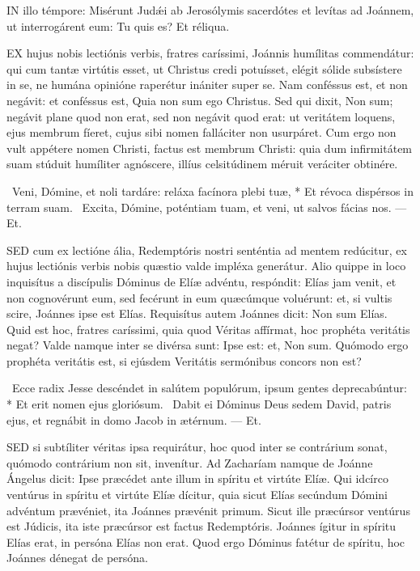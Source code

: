 


\lettrine[lines=2]{I}{N} illo témpore: Misérunt Judǽi ab Jerosólymis sacerdótes et levítas ad Joánnem, ut interrogárent eum: Tu quis es? Et réliqua.



\lettrine[lines=2]{E}{X} hujus nobis lectiónis verbis, fratres caríssimi, Joánnis humílitas commendátur: qui cum tantæ virtútis esset, ut Christus credi potuísset, elégit sólide subsístere in se, ne humána opinióne raperétur inániter super se. Nam conféssus est, et non negávit: et conféssus est, Quia non sum ego Christus. Sed qui dixit, Non sum; negávit plane quod non erat, sed non negávit quod erat: ut veritátem loquens, ejus membrum fíeret, cujus sibi nomen falláciter non usurpáret. Cum ergo non vult appétere nomen Christi, factus est membrum Christi: quia dum infirmitátem suam stúduit humíliter agnóscere, illíus celsitúdinem méruit veráciter obtinére.

\R\ Veni, Dómine, et noli tardáre: reláxa facínora plebi tuæ, * Et révoca dispérsos in terram suam. \V\ Excita, Dómine, poténtiam tuam, et veni, ut salvos fácias nos. --- Et.


\lettrine[lines=2]{S}{ED} cum ex lectióne ália, Redemptóris nostri senténtia ad mentem redúcitur, ex hujus lectiónis verbis nobis quæstio valde impléxa generátur. Alio quippe in loco inquisítus a discípulis Dóminus de Elíæ advéntu, respóndit: Elías jam venit, et non cognovérunt eum, sed fecérunt in eum quæcúmque voluérunt: et, si vultis scire, Joánnes ipse est Elías. Requisítus autem Joánnes dicit: Non sum Elías. Quid est hoc, fratres caríssimi, quia quod Véritas affírmat, hoc prophéta veritátis negat? Valde namque inter se divérsa sunt: Ipse est: et, Non sum. Quómodo ergo prophéta veritátis est, si ejúsdem Veritátis sermónibus concors non est?

\R\ Ecce radix Jesse descéndet in salútem populórum, ipsum gentes deprecabúntur: * Et erit nomen ejus gloriósum. \V\ Dabit ei Dóminus Deus sedem David, patris ejus, et regnábit in domo Jacob in ætérnum. --- Et.


\lettrine[lines=2]{S}{ED} si subtíliter véritas ipsa requirátur, hoc quod inter se contrárium sonat, quómodo contrárium non sit, invenítur. Ad Zacharíam namque de Joánne Ángelus dicit: Ipse præcédet ante illum in spíritu et virtúte Elíæ. Qui idcírco ventúrus in spíritu et virtúte Elíæ dícitur, quia sicut Elías secúndum Dómini advéntum prævéniet, ita Joánnes prævénit primum. Sicut ille præcúrsor ventúrus est Júdicis, ita iste præcúrsor est factus Redemptóris. Joánnes ígitur in spíritu Elías erat, in persóna Elías non erat. Quod ergo Dóminus fatétur de spíritu, hoc Joánnes dénegat de persóna.

